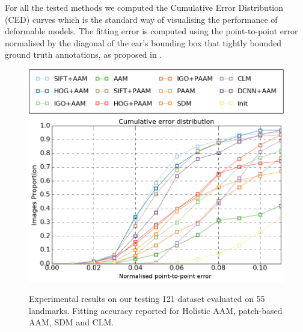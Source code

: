 For all the tested methods we computed the Cumulative Error Distribution (CED) curves which is the standard way of visualising the performance of deformable models. The fitting error is computed using the point-to-point error normalised by the diagonal of the ear's bounding box that tightly bounded ground truth annotations, as proposed in \cite{Zhu2012}.


\begin{figure}[t!]
    \centering
    \includegraphics[width=\columnwidth]{resources/Ear_Deformable_Model/benchmark_ear_legend} \\
    \includegraphics[width=\columnwidth]{resources/Ear_Deformable_Model/benchmark_ear}
    \caption{Experimental results on our testing 121 dataset evaluated on 55 landmarks. Fitting accuracy reported for Holistic AAM, patch-based AAM, SDM and CLM.}
    \label{fig:fitting_results}
\end{figure}

